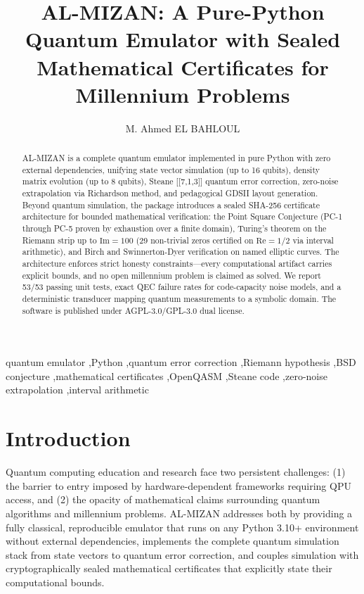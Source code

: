 \documentclass[preprint,12pt]{elsarticle}
\begin{document}
\begin{frontmatter}

\title{AL-MIZAN: A Pure-Python Quantum Emulator with Sealed Mathematical Certificates for Millennium Problems}

\author{M. Ahmed EL BAHLOUL}
\address{IMAM8MAHDI Research Initiative, Valence, France}

\begin{abstract}
AL-MIZAN is a complete quantum emulator implemented in pure Python with zero external dependencies, unifying state vector simulation (up to 16 qubits), density matrix evolution (up to 8 qubits), Steane [[7,1,3]] quantum error correction, zero-noise extrapolation via Richardson method, and pedagogical GDSII layout generation. Beyond quantum simulation, the package introduces a sealed SHA-256 certificate architecture for bounded mathematical verification: the Point Square Conjecture (PC-1 through PC-5 proven by exhaustion over a finite domain), Turing's theorem on the Riemann strip up to $\mathrm{Im}=100$ (29 non-trivial zeros certified on $\mathrm{Re}=1/2$ via interval arithmetic), and Birch and Swinnerton-Dyer verification on named elliptic curves. The architecture enforces strict honesty constraints---every computational artifact carries explicit bounds, and no open millennium problem is claimed as solved. We report 53/53 passing unit tests, exact QEC failure rates for code-capacity noise models, and a deterministic transducer mapping quantum measurements to a symbolic domain. The software is published under AGPL-3.0/GPL-3.0 dual license.
\end{abstract}

\begin{keyword}
quantum emulator \sep Python \sep quantum error correction \sep Riemann hypothesis \sep BSD conjecture \sep mathematical certificates \sep OpenQASM \sep Steane code \sep zero-noise extrapolation \sep interval arithmetic
\end{keyword}

\end{frontmatter}

\section{Introduction}

Quantum computing education and research face two persistent challenges: (1) the barrier to entry imposed by hardware-dependent frameworks requiring QPU access, and (2) the opacity of mathematical claims surrounding quantum algorithms and millennium problems. AL-MIZAN addresses both by providing a fully classical, reproducible emulator that runs on any Python 3.10+ environment without external dependencies, implements the complete quantum simulation stack from state vectors to quantum error correction, and couples simulation with cryptographically sealed mathematical certificates that explicitly state their computational bounds.
\end{document}
